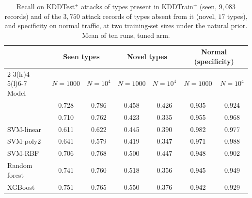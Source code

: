 \begin{table}[t]
\centering
\caption{Recall on KDDTest$^+$ attacks of types present in KDDTrain$^+$ (seen, $9{,}083$ records) and of the $3{,}750$ attack records of types
absent from it (novel, $17$ types), and specificity on normal traffic, at two training-set
sizes under the natural prior. Mean of ten runs, tuned arm.}
\label{tab:novel}
\footnotesize
\setlength{\tabcolsep}{4pt}
\begin{tabular}{@{}l cc cc cc@{}}
\toprule
 & \multicolumn{2}{c}{Seen types} & \multicolumn{2}{c}{Novel types} & \multicolumn{2}{c}{Normal (specificity)} \\
\cmidrule(lr){2-3}\cmidrule(lr){4-5}\cmidrule(l){6-7}
Model & $N=1000$ & $N=10^4$ & $N=1000$ & $N=10^4$ & $N=1000$ & $N=10^4$ \\
\midrule
\QSVM{} & 0.728 & 0.786 & 0.458 & 0.426 & 0.935 & 0.924 \\
\QSVMZ{} & 0.710 & 0.762 & 0.423 & 0.335 & 0.955 & 0.968 \\
SVM-linear & 0.611 & 0.622 & 0.445 & 0.390 & 0.982 & 0.977 \\
SVM-poly2 & 0.641 & 0.579 & 0.419 & 0.347 & 0.971 & 0.988 \\
SVM-RBF & 0.706 & 0.768 & 0.500 & 0.447 & 0.948 & 0.902 \\
Random forest & 0.741 & 0.760 & 0.518 & 0.356 & 0.945 & 0.949 \\
XGBoost & 0.751 & 0.765 & 0.550 & 0.376 & 0.942 & 0.929 \\
\bottomrule
\end{tabular}
\end{table}
